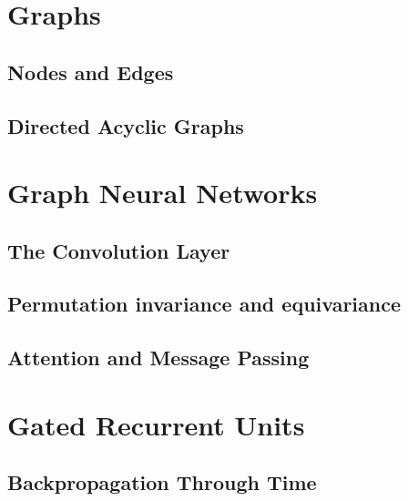 \section{Graphs}
\subsection{Nodes and Edges}
\subsection{Directed Acyclic Graphs}




\section{Graph Neural Networks}
\subsection{The Convolution Layer}
\subsection{Permutation invariance and equivariance}
\subsection{Attention and Message Passing}




\section{Gated Recurrent Units}
\subsection{Backpropagation Through Time}